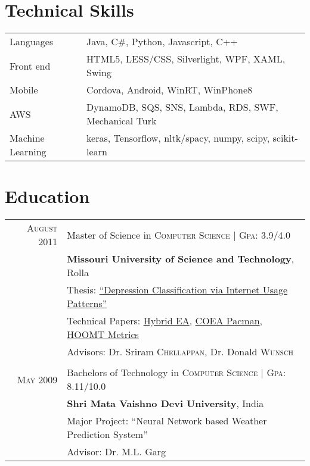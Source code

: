 \documentclass[a4paper,11pt]{article}
\begin{document}
\section{Technical Skills}
\begin{longtable}{lp{11cm}}
 Languages & Java, C\#, Python, Javascript, C++ \\
 Front end & HTML5, LESS/CSS, Silverlight, WPF, XAML, Swing \\
 Mobile & Cordova, Android, WinRT, WinPhone8 \\
 AWS & DynamoDB, SQS, SNS, Lambda, RDS, SWF, Mechanical Turk \\
 Machine Learning & keras, Tensorflow, nltk/spacy, numpy, scipy, scikit-learn \\
\end{longtable}

\section{Education}
\begin{tabularx}{0.95\textwidth}{rX}	
  \textsc{August} 2011 & Master of Science in \textsc{Computer Science} | \normalsize \textsc{Gpa}: 3.9/4.0 \\
& \normalsize \textbf{Missouri University of Science and Technology}, Rolla \\
& Thesis: \href{https://github.com/raghakot/papers/blob/master/thesis.pdf}{``Depression Classification via Internet Usage Patterns''} \\
& Technical Papers: \href{https://github.com/raghakot/papers/blob/master/SPSS.pdf}{Hybrid EA}, \href{https://github.com/raghakot/papers/blob/master/coea_pacman.pdf}{COEA Pacman}, \href{https://github.com/raghakot/papers/blob/master/hoomt_metrics.pdf}{HOOMT Metrics} \\
& \small Advisors: Dr. Sriram \textsc{Chellappan}, Dr. Donald \textsc{Wunsch}\\
& \\
  \textsc{May} 2009 & Bachelors of Technology in \textsc{Computer Science} | \normalsize \textsc{Gpa}: 8.11/10.0 \\
& \normalsize \textbf{Shri Mata Vaishno Devi University}, India \\
& Major Project: ``Neural Network based Weather Prediction System'' \\
& \small Advisor: Dr. M.L. Garg \\
\end{tabularx}
\end{document}
